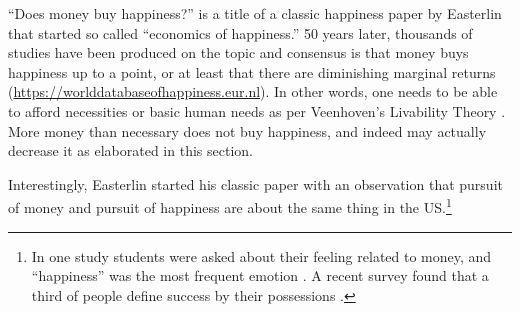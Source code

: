 \documentclass[10pt, letterpaper]{article}
\begin{document}
\begin{spacing}{1.8}
``Does money buy happiness?'' is a title of a classic happiness paper by
Easterlin \citeyear{easterlin73} that started so called ``economics of happiness.'' 50
years later, thousands of studies have been produced on the topic and consensus is
 that money buys happiness up to a point, or at least that there are diminishing marginal
 returns (\url{https://worlddatabaseofhappiness.eur.nl}).
%
%
% 
 In other words, one needs to be able to afford necessities or basic
 human needs as per Veenhoven's Livability Theory \citep{veenhoven14b}. More
 money than necessary does not buy happiness, and indeed may actually decrease
 it as elaborated in this section.

Interestingly, Easterlin started his classic paper with an
observation that pursuit of money and pursuit of happiness are about the same
thing in the US.\footnote{In one study students were asked about their feeling related
to money, and ``happiness'' was the most frequent emotion \citep{mogilner2010pursuit}.
A recent survey found that a third of people define success by their possessions
\citep[cited in][]{joye20}.}
%
%
%
%
%
%


\end{spacing}
\end{document}
